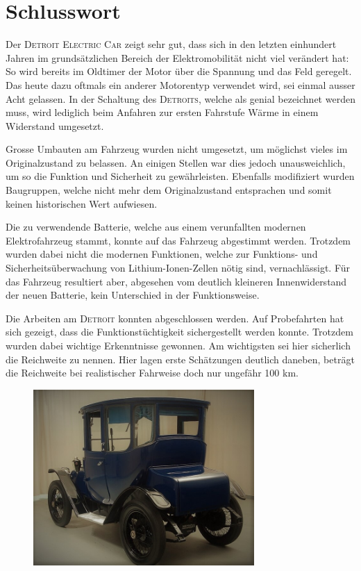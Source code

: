 \chapter{Schlusswort}
\color{blue}
Der \textsc{Detroit Electric Car} zeigt sehr gut, dass sich in den letzten einhundert Jahren im grundsätzlichen Bereich der Elektromobilität nicht viel verändert hat: So wird bereits im Oldtimer der Motor über die Spannung und das Feld geregelt. Das heute dazu oftmals ein anderer Motorentyp verwendet wird, sei einmal ausser Acht gelassen. In der Schaltung des \textsc{Detroits}, welche als genial bezeichnet werden muss, wird lediglich beim Anfahren zur ersten Fahrstufe Wärme in einem Widerstand umgesetzt.

Grosse Umbauten am Fahrzeug wurden nicht umgesetzt, um möglichst vieles im Originalzustand zu belassen. An einigen Stellen war dies jedoch unausweichlich, um so die Funktion und Sicherheit zu gewährleisten. Ebenfalls modifiziert wurden Baugruppen, welche nicht mehr dem Originalzustand entsprachen und somit keinen historischen Wert aufwiesen.

Die zu verwendende Batterie, welche aus einem verunfallten modernen Elektrofahrzeug stammt, konnte auf das Fahrzeug abgestimmt werden. Trotzdem wurden dabei nicht die modernen Funktionen, welche zur Funktions- und Sicherheitsüberwachung von Lithium-Ionen-Zellen nötig sind, vernachlässigt. Für das Fahrzeug resultiert aber, abgesehen vom deutlich kleineren Innenwiderstand der neuen Batterie, kein Unterschied in der Funktionsweise.

Die Arbeiten am \textsc{Detroit} konnten abgeschlossen werden. Auf Probefahrten hat sich gezeigt, dass die Funktionstüchtigkeit sichergestellt werden konnte. Trotzdem wurden dabei wichtige Erkenntnisse gewonnen. Am wichtigsten sei hier sicherlich die Reichweite zu nennen. Hier lagen erste Schätzungen deutlich daneben, beträgt die Reichweite bei realistischer Fahrweise doch nur ungefähr 100 km.

\begin{figure}[h]
	\centering
		\includegraphics[width=0.75\textwidth]{images/Ende.jpg}
	\label{fig:Ende}
\end{figure}


\color{black}